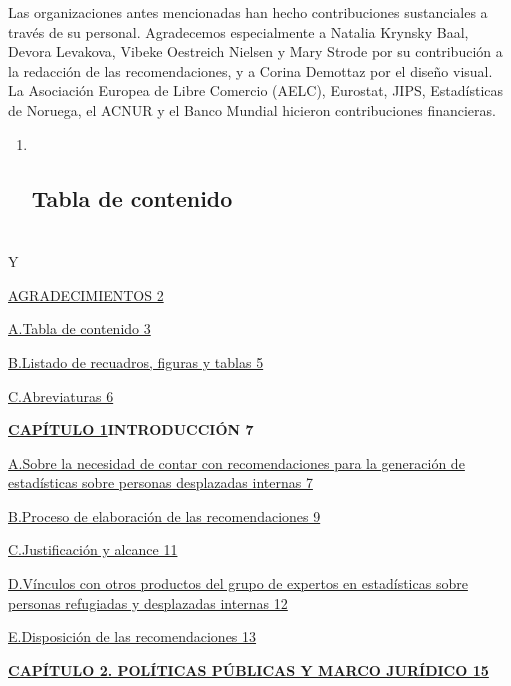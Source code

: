 \documentclass[
]{book}
\begin{document}
Las organizaciones antes mencionadas han hecho contribuciones sustanciales a través de su personal. Agradecemos especialmente a Natalia Krynsky Baal, Devora Levakova, Vibeke Oestreich Nielsen y Mary Strode por su contribución a la redacción de las recomendaciones, y a Corina Demottaz por el diseño visual. La Asociación Europea de Libre Comercio (AELC), Eurostat, JIPS, Estadísticas de Noruega, el ACNUR y el Banco Mundial hicieron contribuciones financieras.

\begin{enumerate}
\def\labelenumi{\arabic{enumi}.}
\item ~
  \hypertarget{tabla-de-contenido}{%
  \section{Tabla de contenido}\label{tabla-de-contenido}}
\end{enumerate}

\hypertarget{section-2}{%
\chapter{}\label{section-2}}

Y

\protect\hyperlink{_Toc71834729}{AGRADECIMIENTOS 2}

\protect\hyperlink{_Toc71834730}{A.Tabla de contenido 3}

\protect\hyperlink{_Toc71834731}{B.Listado de recuadros, figuras y tablas 5}

\protect\hyperlink{_Toc71834732}{C.Abreviaturas 6}

\textbf{\protect\hyperlink{_Toc71834733}{CAPÍTULO 1}INTRODUCCIÓN 7}

\protect\hyperlink{_Toc71834734}{A.Sobre la necesidad de contar con recomendaciones para la generación de estadísticas sobre personas desplazadas internas 7}

\protect\hyperlink{_Toc71834735}{B.Proceso de elaboración de las recomendaciones 9}

\protect\hyperlink{_Toc71834736}{C.Justificación y alcance 11}

\protect\hyperlink{_Toc71834737}{D.Vínculos con otros productos del grupo de expertos en estadísticas sobre personas refugiadas y desplazadas internas 12}

\protect\hyperlink{_Toc71834738}{E.Disposición de las recomendaciones 13}

\textbf{\protect\hyperlink{_Toc71834739}{CAPÍTULO 2. POLÍTICAS PÚBLICAS Y MARCO JURÍDICO 15}}
\end{document}
